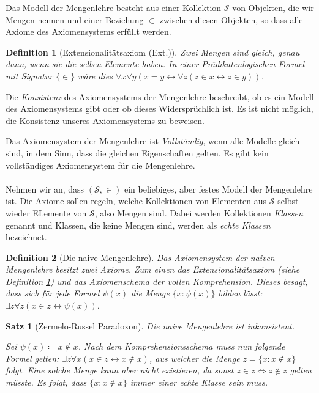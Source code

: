 \documentclass[german]{article}
\theoremstyle{break}
\theoremstyle{def_style}
\newtheorem{definition}{Definition}[section]
\theoremstyle{def_style}
\newtheorem{satz}{Satz}[section]
\theoremstyle{lemma_style}
\begin{document}
Das Modell der Mengenlehre besteht aus einer Kollektion $\mathcal{S}$ von Objekten, die wir Mengen nennen und einer Beziehung $\in$ zwischen diesen Objekten, so dass alle Axiome des Axiomensystems erfüllt werden.

\begin{definition}[Extensionalitätsaxiom (Ext.)]
	Zwei Mengen sind gleich, genau dann, wenn sie die selben Elemente haben. In einer Prädikatenlogischen-Formel mit Signatur $\{\in\}$ wäre dies $\forall x \forall y (x=y \leftrightarrow \forall z (z \in x \leftrightarrow z \in y))$.
	\label{ExtAxiom}
\end{definition}

Die \textit{Konsistenz} des Axiomensystems der Mengenlehre beschreibt, ob es ein Modell des Axiomensystems gibt oder ob dieses Widersprüchlich ist. Es ist nicht möglich, die Konsistenz unseres Axiomensystems zu beweisen.

Das Axiomensystem der Mengenlehre ist \textit{Vollständig}, wenn alle Modelle \glqq gleich \grqq{} sind, in dem Sinn, dass die gleichen Eigenschaften gelten. Es gibt kein vollständiges Axiomensystem für die Mengenlehre.
\\
\\
Nehmen wir an, dass $(\mathcal{S},\in)$ ein beliebiges, aber festes Modell der Mengenlehre ist. Die Axiome sollen regeln, welche Kollektionen von Elementen aus $\mathcal{S}$ selbst wieder ELemente von $\mathcal{S}$, also Mengen sind. Dabei werden Kollektionen \textit{Klassen} genannt und Klassen, die keine Mengen sind, werden als \textit{echte Klassen} bezeichnet.

\begin{definition}[Die naive Mengenlehre]
	Das Axiomensystem der naiven Mengenlehre besitzt zwei Axiome. Zum einen das Extensionalitätsaxiom (siehe Definition \ref{ExtAxiom}) und das Axiomenschema der vollen Komprehension. Dieses besagt, dass sich für jede Formel $\psi(x)$ die Menge $\{x : \psi(x)\}$ bilden lässt: $\exists z \forall z(x \in z \leftrightarrow \psi(x))$.
\end{definition}

\begin{satz}[Zermelo-Russel Paradoxon]
	Die naive Mengenlehre ist inkonsistent.
	
	Sei $\psi(x)\coloneqq x\notin x$. Nach dem Komprehensionsschema muss nun folgende Formel gelten: $\exists z \forall x(x\in z \leftrightarrow x\notin x)$, aus welcher die Menge $z=\{x : x\notin x\}$ folgt. Eine solche Menge kann aber nicht existieren, da sonst $z\in z \Leftrightarrow z \notin z$ gelten müsste. Es folgt, dass $\{x:x\notin x\}$ immer einer echte Klasse sein muss.
\end{satz}
\end{document}
